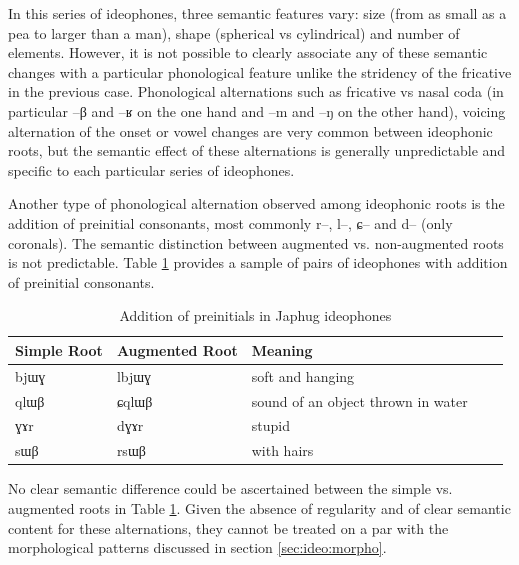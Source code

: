 \documentclass[oldfontcommands,oneside,a4paper,11pt]{article}
\newcommand{\ipa}[1]{{\phon \mbox{#1}}} %
\begin{document}
In this series of ideophones, three semantic features vary: size (from as small as a pea to larger than a man), shape (spherical vs cylindrical) and number of elements. However, it is not possible to clearly associate any of these semantic changes with a particular phonological feature unlike the stridency of the fricative in the previous case. Phonological alternations such as fricative vs nasal coda (in particular \ipa{--β} and \ipa{--ʁ} on the one hand and \ipa{--m} and \ipa{--ŋ} on the other hand), voicing alternation of the onset or vowel changes are very common between ideophonic roots, but the semantic effect of these alternations is generally unpredictable  and specific to each  particular series of ideophones.




Another type of phonological alternation observed among ideophonic roots is the addition of preinitial consonants, most commonly \ipa{r--}, \ipa{l--}, \ipa{ɕ--} and \ipa{d--} (only coronals). The semantic distinction between   augmented vs. non-augmented roots is not predictable. Table \ref{tab:augmented.root} provides a sample of pairs of ideophones with addition of preinitial consonants.

\begin{table}[h]
\caption{Addition of preinitials in Japhug ideophones} \label{tab:augmented.root} \centering 
\begin{tabular}{lllll}
\toprule
Simple Root&Augmented Root& Meaning     \\
\midrule
\ipa{bjɯɣ}&\ipa{lbjɯɣ}&soft and hanging \\
\ipa{qlɯβ}&\ipa{ɕqlɯβ}&sound of an object thrown in water \\ 
\ipa{ɣɤr}&\ipa{dɣɤr}& stupid \\ 
\ipa{sɯβ}&\ipa{rsɯβ}& with hairs \\ 
\bottomrule
\end{tabular}
\end{table}

No clear semantic difference could be ascertained between the simple vs. augmented roots in Table \ref{tab:augmented.root}. Given the absence of regularity and of clear semantic content for these alternations, they cannot be treated on a par with the morphological patterns discussed in section \ref{sec:ideo:morpho}.
%
\end{document}
